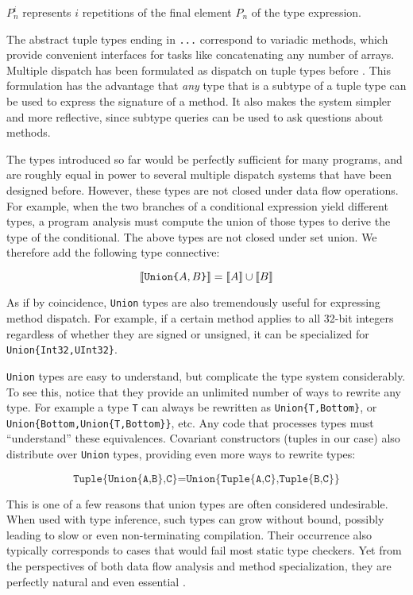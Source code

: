 \noindent
$P_n^i$ represents $i$ repetitions of the final element $P_n$ of the type expression.

The abstract tuple types ending in \texttt{...} correspond to variadic methods, which
provide convenient interfaces for tasks like concatenating any number of arrays.
Multiple dispatch has been formulated as dispatch on tuple types before \cite{Leavens1998}.
This formulation has the advantage that \emph{any} type that is a subtype of a
tuple type can be used to express the signature of a method. It also makes the system
simpler and more reflective, since subtype queries can be used to ask questions about
methods.

The types introduced so far would be perfectly sufficient for many programs, and are
roughly equal in power to several multiple dispatch systems that have been designed
before. However, these types are not closed under data flow operations. For example,
when the two branches of a conditional expression yield different types, a program
analysis must compute the union of those types to derive the type of the conditional.
The above types are not closed under set union. We therefore add the following
type connective:

\vspace{-3ex}
\[
  \llbracket \texttt{Union\{}A,B\texttt{\}} \rrbracket = \llbracket A \rrbracket \cup \llbracket B \rrbracket \\
\]

As if by coincidence, \texttt{Union} types are also tremendously useful for expressing
method dispatch. For example, if a certain method applies to all 32-bit integers regardless
of whether they are signed or unsigned, it can be specialized for \texttt{Union\{Int32,UInt32\}}.

\texttt{Union} types are easy to understand, but complicate the type system considerably.
To see this, notice that they provide an unlimited number of ways to rewrite any type.
For example a type \texttt{T} can always be rewritten as \texttt{Union\{T,Bottom\}}, or
\texttt{Union\{Bottom,Union\{T,Bottom\}\}}, etc. Any code that processes types must
``understand'' these equivalences. Covariant constructors (tuples in our case)
also distribute over \texttt{Union} types, providing even more ways to rewrite types:

\vspace{-3ex}
\[
\texttt{Tuple\{Union\{A,B\},C\}} = \texttt{Union\{Tuple\{A,C\},Tuple\{B,C\}\}}
\]

This is one of a few reasons that union types are often considered undesirable.
When used with type inference, such types can grow without bound, possibly leading
to slow or even non-terminating compilation. Their occurrence also typically
corresponds to cases that would fail most static type checkers. Yet from the
perspectives of both data flow analysis and method specialization, they are
perfectly natural and even essential \cite{abstractinterp}
\cite{Igarashi} \cite{Smith:2008:JTI:1449764.1449804}.


